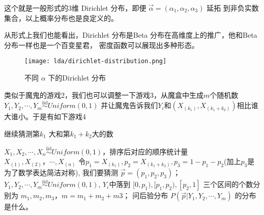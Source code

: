 这个就是一般形式的3维 Dirichlet 分布，即便 $\vec{\alpha}=(\alpha_1,\alpha_2, \alpha_3)$ 延拓
到非负实数集合，以上概率分布也是良定义的。

从形式上我们也能看出，Dirichlet 分布是Beta 分布在高维度上的推广，他和Beta 分布一样也是一个百变星君，
密度函数可以展现出多种形态。
\begin{figure}[htbp]
\centering
\texttt{[image: lda/dirichlet-distribution.png]}
\caption{不同 $\alpha$ 下的Dirichlet 分布}
\end{figure}


类似于魔鬼的游戏2，我们也可以调整一下游戏3，从魔盒中生成$m$个随机数
$Y_1,Y_2,\cdots,Y_m {\stackrel{\mathrm{iid}}{\sim}}Uniform(0,1)$
并让魔鬼告诉我们$Y_i$和$(X_{(k_1)}, X_{(k_1+k_2)})$相比谁大谁小。于是有如下游戏4
\begin{algorithm}[htb]
\caption{继续猜测第$k_1$ 大和第$k_1+k_2$大的数}
\begin{algorithmic}[1]
\STATE $X_1,X_2,\cdots,X_n {\stackrel{\mathrm{iid}}{\sim}}Uniform(0,1)$，排序后对应的顺序统计量 $X_{(1)},X_{(2)}，\cdots, X_{(n)}$
\STATE 令$p_1=X_{(k_1)}, p_2=X_{(k_1+k_2)},p_3 = 1-p_1-p_2$(加上$p_3$是为了数学表达简洁对称),
我们要猜测 $\vec{p}=(p_1,p_2,p_3)$；
\STATE $Y_1,Y_2,\cdots,Y_m {\stackrel{\mathrm{iid}}{\sim}}Uniform(0,1)$, $Y_i$中落到
$[0,p_1),[p_1,p_2),[p_2,1]$ 三个区间的个数分别为 $m_1,m_2,m_3$，$m=m_1+m_2+m3$；
\STATE 问后验分布 $P(\vec{p}|Y_1,Y_2,\cdots,Y_m)$ 的分布是什么。
\end{algorithmic}
\end{algorithm}

